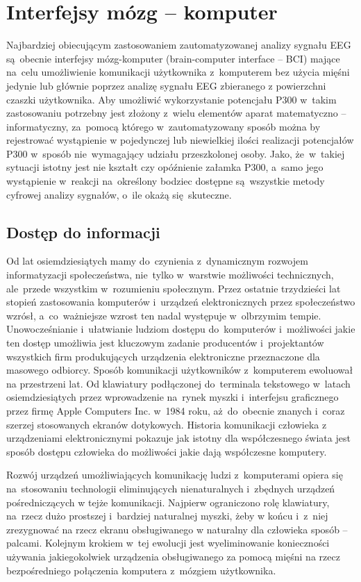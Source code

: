 \documentclass[licencjacka,openright]{pracamgr}
\begin{document}
\section{Interfejsy mózg -- komputer}
Najbardziej obiecującym zastosowaniem zautomatyzowanej analizy sygnału EEG są~obecnie interfejsy mózg-komputer (brain-computer interface -- BCI) mające na~celu umożliwienie komunikacji użytkownika z~komputerem bez użycia mięśni jedynie lub głównie poprzez analizę sygnału EEG zbieranego z powierzchni czaszki użytkownika. Aby umożliwić wykorzystanie potencjału P300 w~takim zastosowaniu potrzebny jest złożony z~wielu elementów aparat matematyczno -- informatyczny, za~pomocą którego w~zautomatyzowany sposób można by rejestrować wystąpienie w pojedynczej lub niewielkiej ilości realizacji potencjałów P300 w~sposób nie~wymagający udziału przeszkolonej osoby. Jako, że~w~takiej sytuacji istotny jest nie kształt czy opóźnienie załamka P300, a~samo jego wystąpienie w~reakcji na~określony bodziec dostępne są~wszystkie metody cyfrowej analizy sygnałów, o~ile okażą się~skuteczne.
\subsection{Dostęp do informacji}
Od lat osiemdziesiątych mamy do~czynienia z~dynamicznym rozwojem informatyzacji społeczeństwa, nie~tylko w~warstwie możliwości technicznych, ale~przede wszystkim w~rozumieniu społecznym. Przez ostatnie trzydzieści lat stopień zastosowania komputerów i~urządzeń elektronicznych przez społeczeństwo wzrósł, a~co~ważniejsze wzrost ten nadal występuje w~olbrzymim tempie. Unowocześnianie i~ułatwianie ludziom dostępu do~komputerów i~możliwości jakie ten dostęp umożliwia jest kluczowym zadanie producentów i~projektantów wszystkich firm produkujących urządzenia elektroniczne przeznaczone dla masowego odbiorcy. Sposób komunikacji użytkowników z~komputerem ewoluował na przestrzeni lat. Od klawiatury podłączonej do~terminala tekstowego w~latach osiemdziesiątych przez wprowadzenie na~rynek myszki i~interfejsu graficznego przez firmę Apple Computers Inc. w~1984 roku, aż~do~obecnie znanych i~coraz szerzej stosowanych ekranów dotykowych. Historia komunikacji człowieka z urządzeniami elektronicznymi pokazuje jak istotny dla współczesnego świata jest sposób dostępu człowieka do możliwości jakie dają współczesne komputery.

Rozwój urządzeń umożliwiających komunikację ludzi z~komputerami opiera się na~stosowaniu technologii eliminujących nienaturalnych i~zbędnych urządzeń pośredniczących w tejże komunikacji. Najpierw ograniczono rolę klawiatury, na~rzecz dużo prostszej i~bardziej naturalnej myszki, żeby w końcu i~z~niej zrezygnować na rzecz ekranu obsługiwanego w naturalny dla człowieka sposób -- palcami. Kolejnym krokiem w~tej ewolucji jest wyeliminowanie konieczności używania jakiegokolwiek urządzenia obsługiwanego za pomocą mięśni na rzecz bezpośredniego połączenia komputera z~mózgiem użytkownika.
\end{document}
